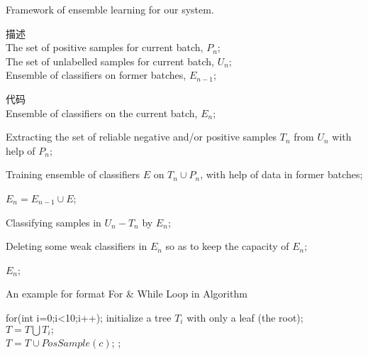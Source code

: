 \documentclass[12pt]{article}
\begin{document}
\begin{CJK}{UTF8}{gbsn}

\begin{algorithm}[htb]
\caption{ Framework of ensemble learning for our system.}             

\label{alg:Framwork}                  

\begin{algorithmic}[1]                

\REQUIRE 描述\\                          
    The set of positive samples for current batch, $P_n$;\\
    The set of unlabelled samples for current batch, $U_n$;\\ 
    Ensemble of classifiers on former batches, $E_{n-1}$; 

\ENSURE 代码\\                           %

    Ensemble of classifiers on the current batch,  $E_n$; 

\STATE Extracting the set of reliable negative and/or positive samples $T_n$ from $U_n$  with help of $P_n$; \label{code:fram:extract}      %

\STATE Training ensemble of classifiers $E$ on $T_n \cup P_n$, with help of data in former batches; \label{code:fram:trainbase} 

\STATE $E_n=E_{n-1}\cup E$; \label{code:fram:add} 

\STATE Classifying samples in $U_n-T_n$ by $E_n$; \label{code:fram:classify} 

\STATE Deleting some weak classifiers in $E_n$ so as to keep the capacity of $E_n$; \label{code:fram:select} 

\RETURN $E_n$;                %

\end{algorithmic} 

\end{algorithm} 



\begin{algorithm}[h] 

    \caption{An example for format For \& While Loop in Algorithm} 

    \begin{algorithmic}[1] 
    		\STATE for(int i=0;i<10;i++);
            \STATE initialize a tree $T_{i}$ with only a leaf (the root);\\ 
            \STATE $T=T\bigcup T_{i};$\\ 
        \ENDFOR 
         \label{code:TrainBase:getc} 
            \STATE  $T=T \cup PosSample(c)$; \label{code:TrainBase:pos} 
        \ENDFOR; 


\end{algorithmic}
\end{algorithm}
\end{CJK}
\end{document}
